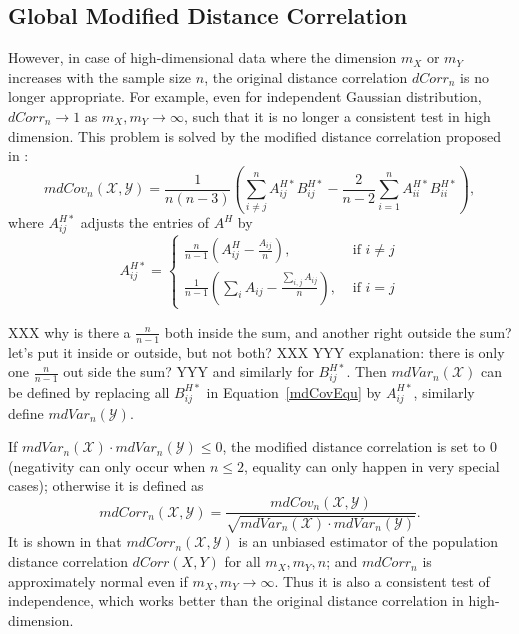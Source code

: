 \documentclass[11pt]{article}
\begin{document}
\subsection{Global Modified Distance Correlation}
\label{sec:gmd}


However, in case of high-dimensional data where the dimension $m_{X}$ or $m_{Y}$ increases with the sample size $n$, the original distance correlation $dCorr_{n}$ is no longer appropriate. For example, even for independent Gaussian distribution, $dCorr_{n} \rightarrow 1$ as $m_{X}, m_{Y} \rightarrow \infty$, such that it is no longer a consistent test in high dimension. This problem is solved by the modified distance correlation proposed in \cite{SzekelyRizzo2013a}:
\begin{equation}
\label{mdCovEqu}
mdCov_{n}(\mathcal{X},\mathcal{Y})=\frac{1}{n(n-3)}(\sum_{i \neq j}^{n}A^{H*}_{ij}B^{H*}_{ij}-\frac{2}{n-2}\sum_{i=1}^{n}A^{H*}_{ii}B^{H*}_{ii}),
\end{equation}
where $A^{H*}_{ij}$ adjusts the entries of $A^{H}$ by
\[A^{H*}_{ij} = \left\{
  \begin{array}{lr}
    \frac{n}{n-1}(A^{H}_{ij}-\frac{A_{ij}}{n}), & \mbox{ if } i \neq j \\
    \frac{1}{n-1}(\sum_{i}A_{ij}-\frac{\sum_{i,j}A_{ij}}{n}), &\mbox{ if } i = j
  \end{array}
\right.
\] 

XXX why is there a $\frac{n}{n-1}$ both inside the sum, and another right outside the sum? let's put it inside or outside, but not both? XXX 
YYY explanation: there is only one $\frac{n}{n-1}$ out side the sum? YYY
and similarly for $B^{H*}_{ij}$. Then $mdVar_{n}(\mathcal{X})$ can be defined by replacing all $B^{H*}_{ij}$ in Equation~\eqref{mdCovEqu} by $A^{H*}_{ij}$, similarly define $mdVar_{n}(\mathcal{Y})$. 

If $mdVar_{n}(\mathcal{X}) \cdot mdVar_{n}(\mathcal{Y}) \leq 0$, the modified distance correlation is set to $0$ (negativity can only occur when $n\leq 2$, equality can only happen in very special cases); otherwise it is defined as
\begin{equation}
\label{mdCorrEqu}
mdCorr_{n}(\mathcal{X},\mathcal{Y})=\frac{mdCov_{n}(\mathcal{X},\mathcal{Y})}{\sqrt{mdVar_{n}(\mathcal{X}) \cdot mdVar_{n}(\mathcal{Y})}}.
\end{equation}
It is shown in \cite{SzekelyRizzo2013a} that $mdCorr_{n}(\mathcal{X},\mathcal{Y})$ is an unbiased estimator of the population distance correlation $dCorr(X,Y)$ for all $m_{X}, m_{Y}, n$; and $mdCorr_{n}$ is approximately normal even if $m_{X},m_{Y} \rightarrow \infty$. Thus it is also a consistent test of independence, which works better than the original distance correlation in high-dimension.
\end{document}
